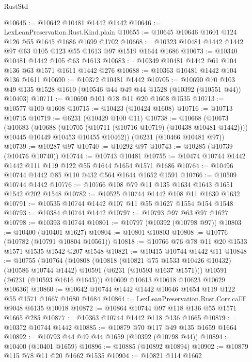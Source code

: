 \begin{lexlean}{RustStd}
\begin{coremodule}
{{@10645 := @10642 @10481 @1442 @1442
@10646 := LexLeanPreservation.Rust.Kind.plain
@10655 := @10645 @10646 @1601 @124 @126 @55 @1645 @1686 @1699 @1702
@10668 := @10323 @10481 @1442 @1442 @97 @63 @105 @123 @55 @1613 @97 @1519 @1644 @1686
@10673 := @10340 @10481 @1442 @105 @63 @1613
@10683 := @10349 @10481 @1442 @61 @104 @136 @63 @1571 @1611 @1442 @276
@10688 := @10363 @10481 @1442 @104 @136 @1611
@10690 := @10372 @10481 @1442
@10705 := @10690
    @70
    @103
    @49
    @135
    @1528
    @1610
    (@10546 @44 @49 @44 @1528 (@10392 (@10551 @44)) @10403)
@10711 := @10690 @101 @78 @11 @20 @1608 @1535
@10713 := @10577 @100 @1608
@10715 := @10423 (@10424 @1608)
@10716 := @10713 @10715
@10719 := @6231 (@10429 @100 @11)
@10738 := @10668
    (@10673
      (@10683
        (@10688 (@10705 (@10711 (@10716 @10719) (@10438 @10481 @1442))))
        @10445
        @10449
        @10453
        @10455
        @10462))
    (@6231 (@10466 @10481 @97))
@10739 := @10287 @97
@10740 := @10292 @97
@10743 := @10285 (@10739 (@10476 @10740))
@10744 := @10743 @10481
@10755 := @10474 @10744 @1442 @1442 @111 @119 @122 @55 @1644 @1654 @1571 @1686
@10764 := @10496 @10744 @1442 @85 @110 @432 @564 @1644 @1652 @1591
@10766 := @10509 @10744 @1442
@10776 := @10766 @108 @79 @11 @135 @1634 @1643 @1651 @1542 @202 @1548
@10782 := @10525 @10744 @1442 @108 @11 @1630 @1632
@10791 := @10535 @10744 @1442 @107 @11 @55 @1627 @1554 @154 @1548
@10793 := @10384 @10744 @1442
@10797 := @10793 @97 @63 @97 @1627
@10798 := @10393 @10744
@10801 := @10797 (@10392 (@10798 @97))
@10803 := @10400 (@10401 @1627)
@10804 := @10801 @10803
@10808 := @10776 (@10782 (@10791 @10804 @10561))
@10818 := @10766 @76 @78 @11 @20 @1533 @1571 @1535 @1542 @207 @1548
@10821 := @10415 @10744 @1442 @11
@10848 := @10755
    (@10764
      (@10808
        (@10818
          (@10821 @75 @1533 @10426 @10432)
          (@10586 @10744 @1442)
          @10591
          (@6231 (@10593 @1637 @1571)))
        @10591
        (@6231 (@10593 @1616 @1643)))
      @10609
      @10613
      @10618
      @10623
      @10629
      @10636)
@10860 := @10642 @10744 @1442 @1442 @10646 @1654 @119 @122 @55 @1571 @1667 @1680 @1684
@10864 := LexLeanPreservation.Rust.Corr.callF @9048 @6135 @10018
@10872 := @10864 @10744 @97 @118 @136 @55 @1571 @1665 @285
@10877 := @10363 @10744 @1442 @118 @136 @1665
@10879 := @10372 @10744 @1442
@10885 := @10879 @70 @117 @49 @135 @1659 @1664
@10892 := @10793 @44 @49 @44 @1659 (@10392 (@10798 @44))
@10894 := @10400 (@10401 @1659)
@10896 := @10885 (@10892 @10894)
@10902 := @10879 @115 @78 @11 @20 @1662 @1535
@10904 := @10821 @114 @1662
}}
\end{coremodule}
\end{lexlean}
